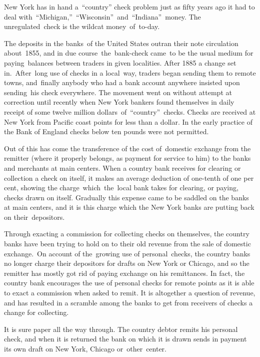 \documentclass[openany,nobib]{tufte-book}
\begin{document}
New York has in hand a~``country'' check problem just as fifty years ago
it had to deal with~``Michigan,''~``Wisconsin''~and~``Indiana''~money.
The unregulated~check is the wildcat money~of~to-day.~~

The deposits in the banks~of the United States outran their note
circulation about~1855, and in due course~the~bank-check came~to be the
usual medium for paying~balances between traders in given localities.
After 1885 a change set in.~After~long use of checks in a local~way,
traders began sending them to remote towns, and~finally anybody who had
a bank account anywhere insisted upon sending~his check everywhere. The
movement went on without attempt at correction until recently when New
York bankers found themselves in daily receipt of some twelve million
dollars~of~``country''~checks. Checks are received at New York from
Pacific coast points for less than a dollar. In the early practice of
the Bank of England checks below ten pounds were not permitted. ~

Out of this has come the transference of the cost of~domestic exchange
from the remitter (where it properly belongs, as payment for service to
him) to the banks and merchants at main centers. When a country bank
receives for clearing or collection a check on itself, it makes an
average deduction of one-tenth of one per cent, showing the
charge~which~the~local bank takes for clearing, or paying, checks drawn
on itself. Gradually this expense came to be saddled on the banks at
main centers, and it is this charge which the New York banks are putting
back on their~depositors.~

Through exacting a commission for collecting checks on themselves, the
country banks have been trying to hold on to their old revenue from the
sale of domestic exchange.~On account of the~growing use of
personal~checks, the country banks no longer charge their depositors for
drafts on New York or Chicago, and so the remitter has mostly got rid of
paying exchange on his remittances. In fact, the country bank encourages
the use of personal checks for remote points as it is able to exact a
commission when asked to remit. It is altogether a question of revenue,
and has resulted in a scramble among the banks to get from receivers of
checks a change for collecting.~

It is sure paper all the way through. The country debtor remits his
personal check, and when it is returned the bank on which it is drawn
sends in payment its own draft on New York, Chicago or~other~center.~
\end{document}
